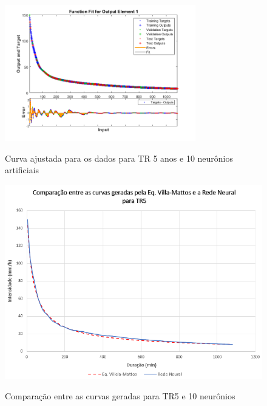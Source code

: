 \begin{figure}[H]
    \caption{Curva ajustada para os dados para TR 5 anos e 10 neurônios artificiais}
    \centering
    \includegraphics[width=0.74\textwidth]{Textuais/Figuras/NN/tr5-10neuronio.png}
    \label{fig:tr5-10n}
\end{figure}

\begin{figure}[H]
    \caption{Comparação entre as curvas geradas para TR5 e 10 neurônios}
    \centering
    \includegraphics[width=\textwidth]{Textuais/Resultados/Comparacao/TR5.png}
    \label{fig:comp-tr5}
\end{figure}